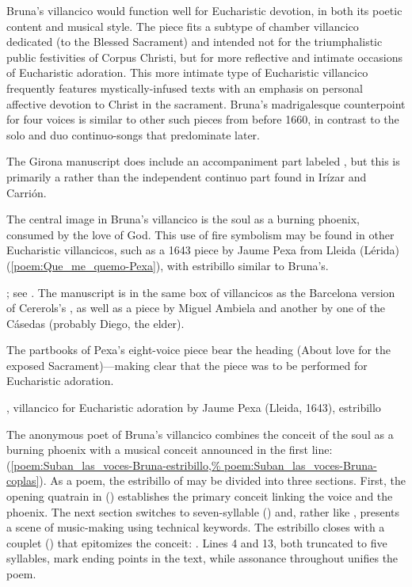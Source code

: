 Bruna's villancico would function well for Eucharistic devotion, in both its
poetic content and musical style.  
The piece fits a subtype of chamber villancico dedicated  (to the Blessed Sacrament) and intended not for the triumphalistic 
public festivities of Corpus Christi, but for more reflective and intimate
occasions of Eucharistic adoration.
This more intimate type of Eucharistic villancico frequently features
mystically-infused texts with an emphasis on personal affective devotion to
Christ in the sacrament.  
Bruna's madrigalesque counterpoint for four voices is similar to other such
pieces from before 1660, in contrast to the solo and duo continuo-songs that
predominate later.%
\begin{Footnote}
    The Girona manuscript does include an accompaniment part labeled
    , but this is primarily a  rather
    than the independent continuo part found in Irízar and Carrión.
\end{Footnote}

The central image in Bruna's villancico is the soul as a burning phoenix,
consumed by the love of God.
This use of fire symbolism may be found in other Eucharistic villancicos, such
as a 1643 piece by Jaume Pexa from Lleida (Lérida)
(\cref{poem:Que_me_quemo-Pexa}), with estribillo similar to Bruna's.%
\begin{Footnote}
    ; see .
    The manuscript is in the same box of villancicos as the Barcelona version
    of Cererols's , as well as a piece by Miguel
    Ambiela and another by one of the Cásedas (probably Diego, the elder).  
\end{Footnote}
The partbooks of Pexa's eight-voice piece bear the heading  (About love for the exposed Sacrament)---making clear that
the piece was to be performed for Eucharistic adoration.  

{, villancico for Eucharistic adoration by Jaume Pexa
(Lleida, 1643), estribillo}

The anonymous poet of Bruna's villancico combines the conceit of the soul as a
burning phoenix with a musical conceit announced in the first line:  (\cref{poem:Suban_las_voces-Bruna-estribillo,%
poem:Suban_las_voces-Bruna-coplas}).
As a poem, the estribillo of  may be divided into three
sections. 
First, the opening quatrain in  () establishes
the primary conceit linking the voice and the phoenix.
The next section switches to seven-syllable 
() and, rather like , presents
a scene of music-making using technical keywords.
The estribillo closes with a couplet () that epitomizes the
conceit: .
Lines 4 and 13, both truncated to five syllables, mark ending points in the
text, while assonance throughout unifies the poem.

